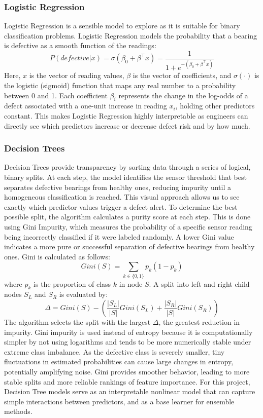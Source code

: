 \documentclass{article}
\begin{document}
\subsubsection*{Logistic Regression}
Logistic Regression is a sensible model to explore as it is suitable for binary classification problems. Logistic Regression models the probability that a bearing is defective as a smooth function of the readings:
$$P(defective|x) = \sigma(\beta_{0} + \beta^{\top}x) = \frac{1}{1 + e^{-(\beta_{0} + \beta^{\top}x)}}$$
Here, $x$ is the vector of reading values, $\beta$ is the vector of coefficients, and $\sigma(\cdot)$ is the logistic (sigmoid) function that maps any real number to a probability between 0 and 1. Each coefficient $\beta_i$ represents the change in the log-odds of a defect associated with a one-unit increase in reading $x_i$, holding other predictors constant. This makes Logistic Regression highly interpretable as engineers can directly see which predictors increase or decrease defect risk and by how much.
 
\subsubsection*{Decision Trees}
Decision Trees provide transparency by sorting data through a series of logical, binary splits. At each step, the model identifies the sensor threshold that best separates defective bearings from healthy ones, reducing impurity until a homogeneous classification is reached. This visual approach allows us to see exactly which predictor values trigger a defect alert. To determine the best possible split, the algorithm calculates a purity score at each step. This is done using Gini Impurity, which measures the probability of a specific sensor reading being incorrectly classified if it were labeled randomly. A lower Gini value indicates a more pure or successful separation of defective bearings from healthy ones. Gini is calculated as follows:
$$Gini(S) = \sum_{k \in \{0,1\}} p_{k}(1 - p_{k})$$
where $p_k$ is the proportion of class $k$ in node $S$. A split into left and right child nodes $S_L$ and $S_R$ is evaluated by:
$$\Delta = Gini(S) - \left(\frac{|S_{L}|}{|S|}Gini(S_{L}) + \frac{|S_{R}|}{|S|}Gini(S_{R})\right)$$
The algorithm selects the split with the largest $\Delta$, the greatest reduction in impurity.
Gini impurity is used instead of entropy because it is computationally simpler by not
using logarithms and tends to be more numerically stable under extreme class imbalance.
As the defective class is severely smaller, tiny fluctuations in estimated probabilities
can cause large changes in entropy, potentially amplifying noise. Gini provides smoother
behavior, leading to more stable splits and more reliable rankings of feature importance.
For this project, Decision Tree models serve as an interpretable nonlinear model that
can capture simple interactions between predictors, and as a base learner for ensemble methods.
 
\end{document}
